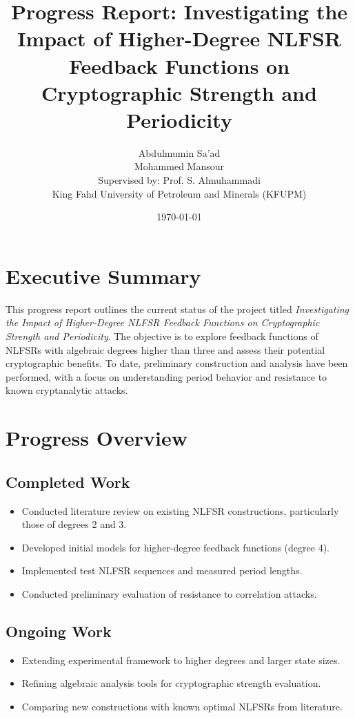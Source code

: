 \documentclass[11pt]{article}
\title{Progress Report: Investigating the Impact of Higher-Degree NLFSR Feedback Functions on Cryptographic Strength and Periodicity}
\author{
    Abdulmumin Sa'ad \\
    Mohammed Mansour \\
    Supervised by: Prof. S. Almuhammadi \\
    King Fahd University of Petroleum and Minerals (KFUPM)
}
\date{\today}
\begin{document}
\maketitle

\section*{Executive Summary}
This progress report outlines the current status of the project titled \textit{Investigating the Impact of Higher-Degree NLFSR Feedback Functions on Cryptographic Strength and Periodicity}. The objective is to explore feedback functions of NLFSRs with algebraic degrees higher than three and assess their potential cryptographic benefits. To date, preliminary construction and analysis have been performed, with a focus on understanding period behavior and resistance to known cryptanalytic attacks.

\section{Progress Overview}
\subsection{Completed Work}
\begin{itemize}
    \item Conducted literature review on existing NLFSR constructions, particularly those of degrees 2 and 3.
    \item Developed initial models for higher-degree feedback functions (degree 4).
    \item Implemented test NLFSR sequences and measured period lengths.
    \item Conducted preliminary evaluation of resistance to correlation attacks.
\end{itemize}

\subsection{Ongoing Work}
\begin{itemize}
    \item Extending experimental framework to higher degrees and larger state sizes.
    \item Refining algebraic analysis tools for cryptographic strength evaluation.
    \item Comparing new constructions with known optimal NLFSRs from literature.
\end{itemize}
\end{document}
